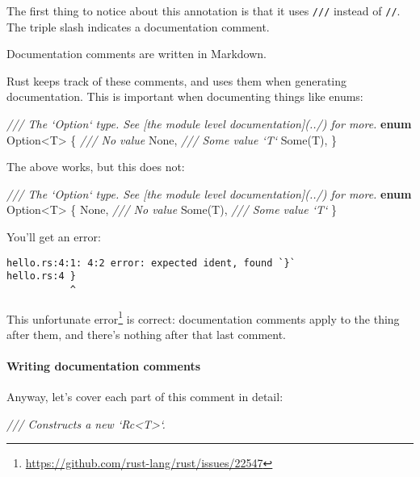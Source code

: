 \documentclass[a4paper,]{book}
\newenvironment{Shaded}{\begin{snugshade}}{\end{snugshade}}
\newcommand{\KeywordTok}[1]{\textcolor[rgb]{0.13,0.29,0.53}{\textbf{{#1}}}}
\newcommand{\DataTypeTok}[1]{\textcolor[rgb]{0.13,0.29,0.53}{{#1}}}
\newcommand{\ConstantTok}[1]{\textcolor[rgb]{0.00,0.00,0.00}{{#1}}}
\newcommand{\CommentTok}[1]{\textcolor[rgb]{0.56,0.35,0.01}{\textit{{#1}}}}
\newcommand{\NormalTok}[1]{{#1}}
\renewcommand{\href}[2]{#2\footnote{\url{#1}}}
\let\oldparagraph\paragraph
\renewcommand{\paragraph}[1]{\oldparagraph{#1}\mbox{}}
\begin{document}
The first thing to notice about this annotation is that it uses
\texttt{///} instead of \texttt{//}. The triple slash indicates a
documentation comment.

Documentation comments are written in Markdown.

Rust keeps track of these comments, and uses them when generating
documentation. This is important when documenting things like enums:

\begin{Shaded}
\begin{Highlighting}[]
\CommentTok{/// The `Option` type. See [the module level documentation](../) for more.}
\KeywordTok{enum} \DataTypeTok{Option}\NormalTok{<T> \{}
    \CommentTok{/// No value}
    \ConstantTok{None}\NormalTok{,}
    \CommentTok{/// Some value `T`}
    \ConstantTok{Some}\NormalTok{(T),}
\NormalTok{\}}
\end{Highlighting}
\end{Shaded}

The above works, but this does not:

\begin{Shaded}
\begin{Highlighting}[]
\CommentTok{/// The `Option` type. See [the module level documentation](../) for more.}
\KeywordTok{enum} \DataTypeTok{Option}\NormalTok{<T> \{}
    \ConstantTok{None}\NormalTok{, }\CommentTok{/// No value}
    \ConstantTok{Some}\NormalTok{(T), }\CommentTok{/// Some value `T`}
\NormalTok{\}}
\end{Highlighting}
\end{Shaded}

You'll get an error:

\begin{verbatim}
hello.rs:4:1: 4:2 error: expected ident, found `}`
hello.rs:4 }
           ^
\end{verbatim}

This \href{https://github.com/rust-lang/rust/issues/22547}{unfortunate
error} is correct: documentation comments apply to the thing after them,
and there's nothing after that last comment.

\paragraph{Writing documentation
comments}\label{writing-documentation-comments}

Anyway, let's cover each part of this comment in detail:

\begin{Shaded}
\begin{Highlighting}[]
\CommentTok{/// Constructs a new `Rc<T>`.}
\end{Highlighting}
\end{Shaded}
\end{document}
